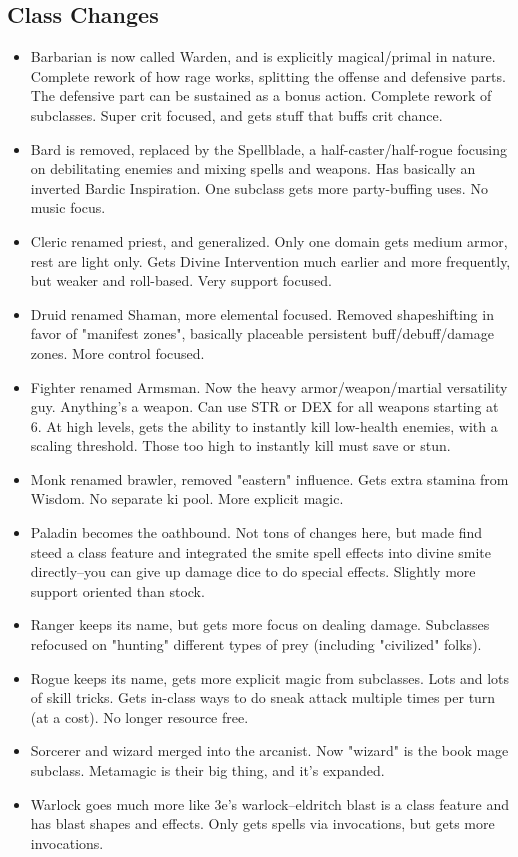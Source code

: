 \subsection*{Class Changes}
\begin{itemize}
    \item Barbarian is now called Warden, and is explicitly magical/primal in nature. Complete rework of how rage works, splitting the offense and defensive parts. The defensive part can be sustained as a bonus action. Complete rework of subclasses. Super crit focused, and gets stuff that buffs crit chance.
    \item Bard is removed, replaced by the Spellblade, a half-caster/half-rogue focusing on debilitating enemies and mixing spells and weapons. Has basically an inverted Bardic Inspiration. One subclass gets more party-buffing uses. No music focus.
    \item Cleric renamed priest, and generalized. Only one domain gets medium armor, rest are light only. Gets Divine Intervention much earlier and more frequently, but weaker and roll-based. Very support focused.
    \item Druid renamed Shaman, more elemental focused. Removed shapeshifting in favor of "manifest zones", basically placeable persistent buff/debuff/damage zones. More control focused.
    \item Fighter renamed Armsman. Now the heavy armor/weapon/martial versatility guy. Anything's a weapon. Can use STR or DEX for all weapons starting at 6. At high levels, gets the ability to instantly kill low-health enemies, with a scaling threshold. Those too high to instantly kill must save or stun.
    \item Monk renamed brawler, removed "eastern" influence. Gets extra stamina from Wisdom. No separate ki pool. More explicit magic.
    \item Paladin becomes the oathbound. Not tons of changes here, but made find steed a class feature and integrated the smite spell effects into divine smite directly--you can give up damage dice to do special effects. Slightly more support oriented than stock.
    \item Ranger keeps its name, but gets more focus on dealing damage. Subclasses refocused on "hunting" different types of prey (including "civilized" folks).
    \item Rogue keeps its name, gets more explicit magic from subclasses. Lots and lots of skill tricks. Gets in-class ways to do sneak attack multiple times per turn (at a cost). No longer resource free.
    \item Sorcerer and wizard merged into the arcanist. Now "wizard" is the book mage subclass. Metamagic is their big thing, and it's expanded.
    \item Warlock goes much more like 3e's warlock--eldritch blast is a class feature and has blast shapes and effects. Only gets spells via invocations, but gets more invocations.
\end{itemize}
